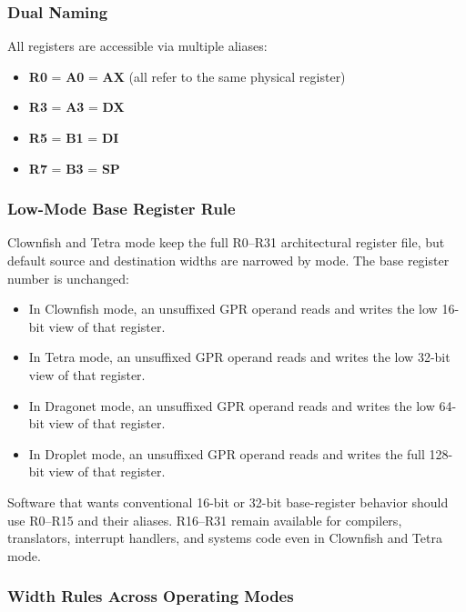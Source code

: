 \documentclass[11pt]{article}
\begin{document}
\subsubsection{Dual Naming}

All registers are accessible via multiple aliases:

\begin{itemize}
    \item \textbf{R0} = \textbf{A0} = \textbf{AX} (all refer to the same physical register)
    \item \textbf{R3} = \textbf{A3} = \textbf{DX}
    \item \textbf{R5} = \textbf{B1} = \textbf{DI}
    \item \textbf{R7} = \textbf{B3} = \textbf{SP}
\end{itemize}

\subsubsection{Low-Mode Base Register Rule}

Clownfish and Tetra mode keep the full R0--R31 architectural register file, but default source and destination widths are narrowed by mode. The base register number is unchanged:

\begin{itemize}
    \item In Clownfish mode, an unsuffixed GPR operand reads and writes the low 16-bit view of that register.
    \item In Tetra mode, an unsuffixed GPR operand reads and writes the low 32-bit view of that register.
    \item In Dragonet mode, an unsuffixed GPR operand reads and writes the low 64-bit view of that register.
    \item In Droplet mode, an unsuffixed GPR operand reads and writes the full 128-bit view of that register.
\end{itemize}

Software that wants conventional 16-bit or 32-bit base-register behavior should use R0--R15 and their aliases. R16--R31 remain available for compilers, translators, interrupt handlers, and systems code even in Clownfish and Tetra mode.

\subsubsection{Width Rules Across Operating Modes}
\end{document}
